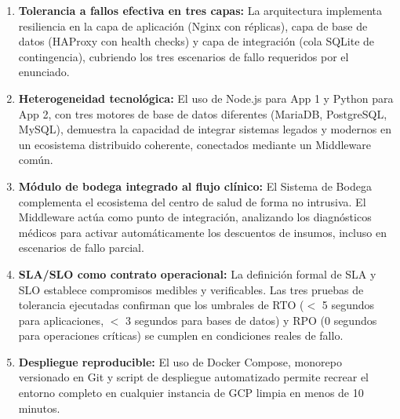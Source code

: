 \documentclass[11pt,a4paper]{article}
\begin{document}
\begin{enumerate}
    \item \textbf{Tolerancia a fallos efectiva en tres capas:}
          La arquitectura implementa resiliencia en la capa de aplicación (Nginx con
          réplicas), capa de base de datos (HAProxy con health checks) y capa de
          integración (cola SQLite de contingencia), cubriendo los tres escenarios
          de fallo requeridos por el enunciado.

    \item \textbf{Heterogeneidad tecnológica:}
          El uso de Node.js para App 1 y Python para App 2, con tres motores de
          base de datos diferentes (MariaDB, PostgreSQL, MySQL), demuestra la
          capacidad de integrar sistemas legados y modernos en un ecosistema
          distribuido coherente, conectados mediante un Middleware común.

    \item \textbf{Módulo de bodega integrado al flujo clínico:}
          El Sistema de Bodega complementa el ecosistema del centro de salud
          de forma no intrusiva. El Middleware actúa como punto de integración,
          analizando los diagnósticos médicos para activar automáticamente los
          descuentos de insumos, incluso en escenarios de fallo parcial.

    \item \textbf{SLA/SLO como contrato operacional:}
          La definición formal de SLA y SLO establece compromisos medibles y
          verificables. Las tres pruebas de tolerancia ejecutadas confirman que
          los umbrales de RTO ($<$ 5 segundos para aplicaciones, $<$ 3 segundos
          para bases de datos) y RPO (0 segundos para operaciones críticas) se
          cumplen en condiciones reales de fallo.

    \item \textbf{Despliegue reproducible:}
          El uso de Docker Compose, monorepo versionado en Git y script de
          despliegue automatizado permite recrear el entorno completo en
          cualquier instancia de GCP limpia en menos de 10 minutos.
\end{enumerate}
\end{document}

